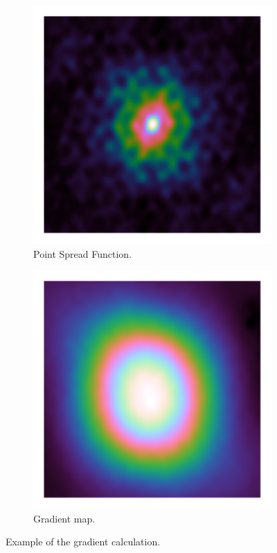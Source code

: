\begin{figure}[h]
\begin{subfigure}[b]{0.3\linewidth}
		\includegraphics[width=\linewidth, clip, trim= 0.125in 0.125in 0.125in 0.125in]{./chapters/03.cd/simulated/psf.png}
		\caption{Point Spread Function.}
		\label{cd:efficient:gradients:psf}
	\end{subfigure}
	\begin{subfigure}[b]{0.3\linewidth}
		\includegraphics[width=\linewidth, clip, trim= 0.125in 0.125in 0.125in 0.125in]{./chapters/03.cd/simulated/gradients.png}
		\caption{Gradient map.}
		\label{cd:efficient:gradients:gradients}
	\end{subfigure}
	
	\caption{Example of the gradient calculation.}
	\label{cd:efficient:gradients:figure}
\end{figure}


